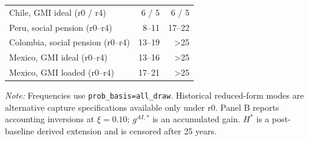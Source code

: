 \begin{table}[H]
\begin{singlespace}
\begin{tabular}{@{}>{\raggedright\arraybackslash}p{}rr@{}}
\midrule
Chile, GMI ideal (r0 / r4) & 6 / 5 & 6 / 5 \\
Peru, social pension (r0--r4) & 8--11 & 17--22 \\
Colombia, social pension (r0--r4) & 13--19 & >25 \\
Mexico, GMI ideal (r0--r4) & 13--16 & >25 \\
Mexico, GMI loaded (r0--r4) & 17--21 & >25 \\
\bottomrule
\end{tabular}
\begin{minipage}{0.94\textwidth}\footnotesize
\emph{Note:} Frequencies use \texttt{prob\_basis=all\_draw}. Historical reduced-form modes are alternative capture specifications available only under r0. Panel B reports accounting inversions at $\xi=0.10$; $g^{AI,*}$ is an accumulated gain. $H^*$ is a post-baseline derived extension and is censored after 25 years.
\end{minipage}
\end{singlespace}
\end{table}
